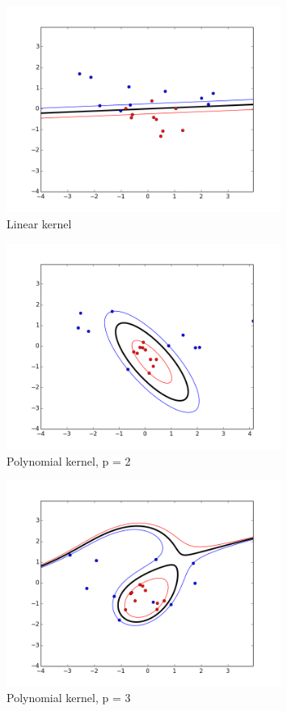\documentclass[a4paper]{article}
\begin{document}
\begin{figure}
\centering
\includegraphics[width=0.8\textwidth]{linear_kernel.png}
\caption{\label{fig:linear_kernel}Linear kernel}
\end{figure}

\begin{figure}
\centering
\includegraphics[width=0.8\textwidth]{polynomial_kernel_2.png}
\caption{\label{fig:polynomial_kernel_2}Polynomial kernel, p = 2}
\end{figure}

\begin{figure}
\centering
\includegraphics[width=0.8\textwidth]{polynomial_kernel_3.png}
\caption{\label{fig:polynomial_kernel_3}Polynomial kernel, p = 3}
\end{figure}
\end{document}
